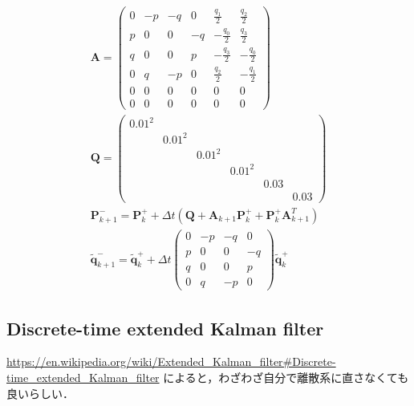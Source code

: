 \begin{align}
  \boldsymbol{A} =
  \begin{pmatrix}
    0 & -p & -q & 0 & \frac{q_1}{2} & \frac{q_2}{2}\\
    p & 0 & 0 & -q & -\frac{q_0}{2} & \frac{q_3}{2}\\
    q & 0 & 0 & p & -\frac{q_3}{2} & -\frac{q_0}{2}\\
    0 & q & -p & 0 & \frac{q_2}{2} & -\frac{q_1}{2}\\
    0 & 0 & 0 & 0 & 0 & 0\\
    0 & 0 & 0 & 0 & 0 & 0
  \end{pmatrix}\\
  \boldsymbol{Q} =
  \begin{pmatrix}
    0.01^2\\
    & 0.01^2\\
    && 0.01^2\\
    &&& 0.01^2\\
    &&&& 0.03\\
    &&&&& 0.03
  \end{pmatrix}\\
  \boldsymbol{P}^{-}_{k+1} = \boldsymbol{P}^{+}_{k} + \Delta t \left(\boldsymbol{Q} + \boldsymbol{A}_{k+1} \boldsymbol{P}^{+}_{k} + \boldsymbol{P}^{+}_{k} \boldsymbol{A}_{k+1}^{T} \right)\\
  \tilde{\boldsymbol{q}}_{k+1}^{-} = \tilde{\boldsymbol{q}}_{k}^{+} +
  \Delta t
  \begin{pmatrix}
    0 & -p & -q & 0\\
    p & 0 & 0 & -q\\
    q & 0 & 0 & p\\
    0 & q & -p & 0
  \end{pmatrix}
  \tilde{\boldsymbol{q}}_{k}^{+}
\end{align}

\subsection{Discrete-time extended Kalman filter}
\url{https://en.wikipedia.org/wiki/Extended_Kalman_filter#Discrete-time_extended_Kalman_filter} によると，わざわざ自分で離散系に直さなくても良いらしい．

